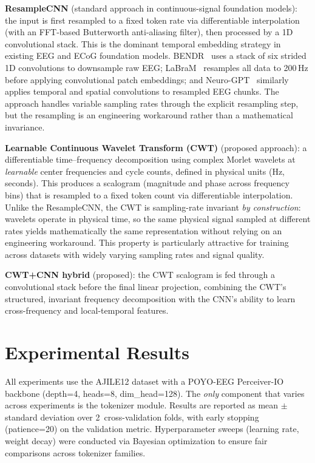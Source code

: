 \documentclass[11pt, a4paper]{article}
\begin{document}
\textbf{ResampleCNN} (standard approach in continuous-signal foundation models): the input is first resampled to a fixed token rate via differentiable interpolation (with an FFT-based Butterworth anti-aliasing filter), then processed by a 1D convolutional stack.  This is the dominant temporal embedding strategy in existing EEG and ECoG foundation models.  BENDR~\cite{kostas2021bendr} uses a stack of six strided 1D convolutions to downsample raw EEG; LaBraM~\cite{jiang2024labram} resamples all data to 200\,Hz before applying convolutional patch embeddings; and Neuro-GPT~\cite{cui2024neurogpt} similarly applies temporal and spatial convolutions to resampled EEG chunks.  The approach handles variable sampling rates through the explicit resampling step, but the resampling is an engineering workaround rather than a mathematical invariance.

\textbf{Learnable Continuous Wavelet Transform (CWT)} (proposed approach): a differentiable time--frequency decomposition using complex Morlet wavelets at \emph{learnable} center frequencies and cycle counts, defined in physical units (Hz, seconds).  This produces a scalogram (magnitude and phase across frequency bins) that is resampled to a fixed token count via differentiable interpolation.  Unlike the ResampleCNN, the CWT is sampling-rate invariant \emph{by construction}: wavelets operate in physical time, so the same physical signal sampled at different rates yields mathematically the same representation without relying on an engineering workaround.  This property is particularly attractive for training across datasets with widely varying sampling rates and signal quality.

\textbf{CWT+CNN hybrid} (proposed): the CWT scalogram is fed through a convolutional stack before the final linear projection, combining the CWT's structured, invariant frequency decomposition with the CNN's ability to learn cross-frequency and local-temporal features.


\section{Experimental Results}
\label{sec:results}

All experiments use the AJILE12 dataset with a POYO-EEG Perceiver-IO backbone (depth=4, heads=8, dim\_head=128). The \emph{only} component that varies across experiments is the tokenizer module. Results are reported as mean $\pm$ standard deviation over 2~cross-validation folds, with early stopping (patience=20) on the validation metric. Hyperparameter sweeps (learning rate, weight decay) were conducted via Bayesian optimization to ensure fair comparisons across tokenizer families.
\end{document}
